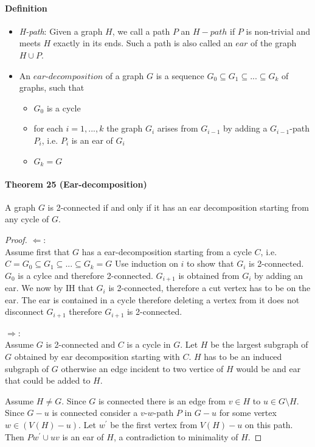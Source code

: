 \paragraph{Definition}
\begin{itemize}
    \item \textit{H-path}: Given a graph $ H $, we call a path $ P $ an $H-path$ 
    if $ P $ is non-trivial and meets $ H $ exactly in its ends. Such a path is also 
    called an $ ear $ of the graph $ H \cup P$.
    \item An $ear$-$decomposition$ of a graph $ G $ is a sequence $ G_0 \subseteq 
    G_1 \subseteq ... \subseteq G_k $ of graphs, such that 
        \begin{itemize}
            \item $G_0$ is a cycle
            \item for each $ i = 1,...,k$ the graph $ G_i $ arises from $ G_{i-1}$
            by adding a $ G_{i-1}$-path $P_i$, i.e. $P_i$ is an ear of $G_i$
            \item $G_k = G$
        \end{itemize} 
\end{itemize}

\paragraph{Theorem 25 (Ear-decomposition)} A graph $ G $ is 2-connected if and only 
if it has an ear decomposition starting from any cycle of $ G$.
\begin{proof}
    $\Leftarrow$: \\
    Assume first that $G$ has a ear-decomposition starting from a cycle $C$, i.e.
    $C = G_0 \subseteq G_1 \subseteq ... \subseteq G_k = G$ Use induction on $i$
    to show that $G_i$ is 2-connected.
    $G_0$ is a cylce and therefore 2-connected. $G_{i+1}$ is obtained from $G_i$
    by adding an ear. We now by IH that $G_i$ is 2-connected, therefore a cut vertex 
    has to be on the ear. The ear is contained in a cycle therefore deleting a 
    vertex from it does not disconnect $G_{i+1}$ therefore $G_{i+1}$ is 2-connected.

    \bigskip \noindent
    $\Rightarrow$: \\
    Assume $G$ is 2-connected and $C$ is a cycle in $G$. Let $H$ be the largest 
    subgraph of $G$ obtained by ear decomposition starting with $C$. $H$ has to 
    be an induced subgraph of $G$ otherwise an edge incident to two vertice of 
    $H$ would be and ear that could be added to $H$.

    \smallskip \noindent
    Assume $H \neq G$. Since $G$ is connected there is an edge from $v \in H$ to 
    $u \in G \setminus H$. Since $G - u$ is connected consider a 
    $v$-$w$-path $P$ in $G-u$ for some vertex $w \in (V(H) - u)$. Let 
    $w^\prime$ be the first vertex from $V(H)-u$ on this path. Then 
    $Pw^\prime \cup uv$ is an ear of $H$, a contradiction to minimality of $H$.
\end{proof}


